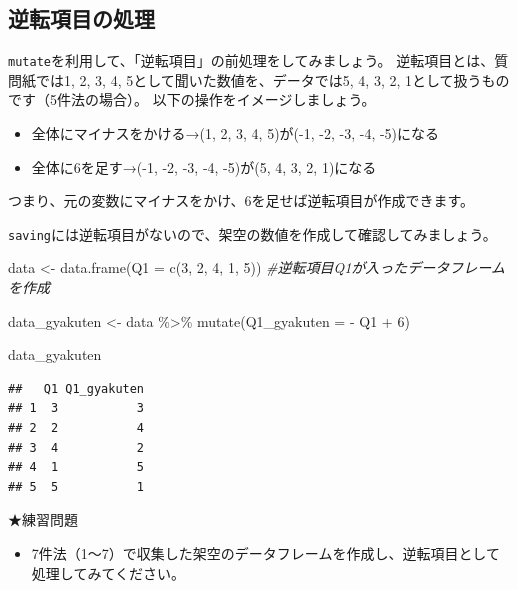 \documentclass[
]{book}
\newenvironment{Shaded}{\begin{snugshade}}{\end{snugshade}}
\newcommand{\AttributeTok}[1]{\textcolor[rgb]{0.77,0.63,0.00}{#1}}
\newcommand{\CommentTok}[1]{\textcolor[rgb]{0.56,0.35,0.01}{\textit{#1}}}
\newcommand{\DecValTok}[1]{\textcolor[rgb]{0.00,0.00,0.81}{#1}}
\newcommand{\FunctionTok}[1]{\textcolor[rgb]{0.00,0.00,0.00}{#1}}
\newcommand{\NormalTok}[1]{#1}
\newcommand{\OtherTok}[1]{\textcolor[rgb]{0.56,0.35,0.01}{#1}}
\newcommand{\SpecialCharTok}[1]{\textcolor[rgb]{0.00,0.00,0.00}{#1}}
\providecommand{\tightlist}{%
  \setlength{\itemsep}{0pt}\setlength{\parskip}{0pt}}
\begin{document}
\hypertarget{ux9006ux8ee2ux9805ux76eeux306eux51e6ux7406}{%
\subsection{逆転項目の処理}\label{ux9006ux8ee2ux9805ux76eeux306eux51e6ux7406}}

\texttt{mutate}を利用して、「逆転項目」の前処理をしてみましょう。
逆転項目とは、質問紙では1, 2, 3, 4, 5として聞いた数値を、データでは5, 4, 3, 2, 1として扱うものです（5件法の場合）。
以下の操作をイメージしましょう。

\begin{itemize}
\tightlist
\item
  全体にマイナスをかける→(1, 2, 3, 4, 5)が(-1, -2, -3, -4, -5)になる
\item
  全体に6を足す→(-1, -2, -3, -4, -5)が(5, 4, 3, 2, 1)になる
\end{itemize}

つまり、元の変数にマイナスをかけ、6を足せば逆転項目が作成できます。

\texttt{saving}には逆転項目がないので、架空の数値を作成して確認してみましょう。

\begin{Shaded}
\begin{Highlighting}[]
\NormalTok{data }\OtherTok{\textless{}{-}} \FunctionTok{data.frame}\NormalTok{(}\AttributeTok{Q1 =} \FunctionTok{c}\NormalTok{(}\DecValTok{3}\NormalTok{, }\DecValTok{2}\NormalTok{, }\DecValTok{4}\NormalTok{, }\DecValTok{1}\NormalTok{, }\DecValTok{5}\NormalTok{)) }\CommentTok{\#逆転項目Q1が入ったデータフレームを作成}

\NormalTok{data\_gyakuten }\OtherTok{\textless{}{-}} 
\NormalTok{  data }\SpecialCharTok{\%\textgreater{}\%}
    \FunctionTok{mutate}\NormalTok{(}\AttributeTok{Q1\_gyakuten =} \SpecialCharTok{{-}}\NormalTok{ Q1 }\SpecialCharTok{+} \DecValTok{6}\NormalTok{)}

\NormalTok{data\_gyakuten}
\end{Highlighting}
\end{Shaded}

\begin{verbatim}
##   Q1 Q1_gyakuten
## 1  3           3
## 2  2           4
## 3  4           2
## 4  1           5
## 5  5           1
\end{verbatim}

★練習問題

\begin{itemize}
\tightlist
\item
  7件法（1〜7）で収集した架空のデータフレームを作成し、逆転項目として処理してみてください。
\end{itemize}
\end{document}
